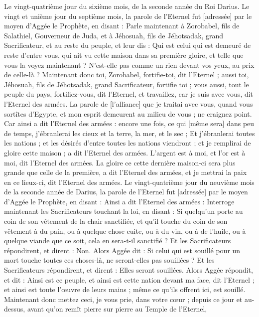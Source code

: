\begin{multicols}{2}
Le vingt-quatrième jour du sixième mois, de la seconde année du Roi Darius.
\VerseOne{}Le vingt et unième jour du septième mois, la parole de l'Eternel fut [adressée] par le moyen d'Aggée le Prophète, en disant :
Parle maintenant à Zorobabel, fils de Salathiel, Gouverneur de Juda, et à Jéhosuah, fils de Jéhotsadak, grand Sacrificateur, et au reste du peuple, et leur dis :
Qui est celui qui est demeuré de reste d'entre vous, qui ait vu cette maison dans sa première gloire, et telle que vous la voyez maintenant ? N'est-elle pas comme un rien devant vos yeux, au prix de celle-là ?
Maintenant donc toi, Zorobabel, fortifie-toi, dit l'Eternel ; aussi toi, Jéhosuah, fils de Jéhotsadak, grand Sacrificateur, fortifie toi ; vous aussi, tout le peuple du pays, fortifiez-vous, dit l'Eternel, et travaillez, car je suis avec vous, dit l'Eternel des armées.
La parole de [l'alliance] que je traitai avec vous, quand vous sortîtes d'Egypte, et mon esprit demeurent au milieu de vous ; ne craignez point.
Car ainsi a dit l'Eternel des armées : encore une fois, ce qui [même sera] dans peu de temps, j'ébranlerai les cieux et la terre, la mer, et le sec ;
Et j'ébranlerai toutes les nations ; et les désirés d'entre toutes les nations viendront ; et je remplirai de gloire cette maison ; a dit l'Eternel des armées.
L'argent est à moi, et l'or est à moi, dit l'Eternel des armées.
La gloire ce cette dernière maison-ci sera plus grande que celle de la première, a dit l'Eternel des armées, et je mettrai la paix en ce lieux-ci, dit l'Eternel des armées.
Le vingt-quatrième jour du neuvième mois de la seconde année de Darius, la parole de l'Eternel fut [adressée] par le moyen d'Aggée le Prophète, en disant :
Ainsi a dit l'Eternel des armées : Interroge maintenant les Sacrificateurs touchant la loi, en disant :
Si quelqu'un porte au coin de son vêtement de la chair sanctifiée, et qu'il touche du coin de son vêtement à du pain, ou à quelque chose cuite, ou à du vin, ou à de l'huile, ou à quelque viande que ce soit, cela en sera-t-il sanctifié ? Et les Sacrificateurs répondirent, et dirent : Non.
Alors Aggée dit : Si celui qui est souillé pour un mort touche toutes ces choses-là, ne seront-elles pas souillées ? Et les Sacrificateurs répondirent, et dirent : Elles seront souillées.
Alors Aggée répondit, et dit : Ainsi est ce peuple, et ainsi est cette nation devant ma face, dit l'Eternel ; et ainsi est toute l'œuvre de leurs mains ; même ce qu'ils offrent ici, est souillé.
Maintenant donc mettez ceci, je vous prie, dans votre cœur ; depuis ce jour et au-dessus, avant qu'on remît pierre sur pierre au Temple de l'Eternel,

\end{multicols}
